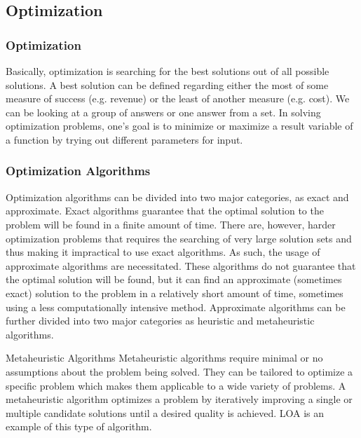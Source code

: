 \documentclass{beamer}
\begin{document}
\subsection{Optimization}

\begin{frame}
\frametitle{Optimization}
Basically, optimization is searching for the best solutions out of all possible solutions. A best solution can be defined regarding either the most of some measure of success (e.g. revenue) or the least of another measure (e.g. cost). We can be looking at a group of answers or one answer from a set. In solving optimization problems, one's goal is to minimize or maximize a result variable of a function by trying out different parameters for input.
\end{frame}

\begin{frame}
\frametitle{Optimization Algorithms}
Optimization algorithms can be divided into two major categories, as exact and approximate. Exact algorithms guarantee that the optimal solution to the problem will be found in a finite amount of time. There are, however, harder optimization problems that requires the searching of very large solution sets and thus making it impractical to use exact algorithms. As such, the usage of approximate algorithms are necessitated. These algorithms do not guarantee that the optimal solution will be found, but it can find an approximate (sometimes exact) solution to the problem in a relatively short amount of time, sometimes using a less computationally intensive method. Approximate algorithms can be further divided into two major categories as heuristic and metaheuristic algorithms.
\end{frame}

\begin{frame}{Metaheuristic Algorithms}
Metaheuristic algorithms require minimal or no assumptions about the problem being solved. They can be tailored to optimize a specific problem which makes them applicable to a wide variety of problems. A metaheuristic algorithm optimizes a problem by iteratively improving a single or multiple candidate solutions until a desired quality is achieved. LOA is an example of this type of algorithm.
\end{frame}
\end{document}
